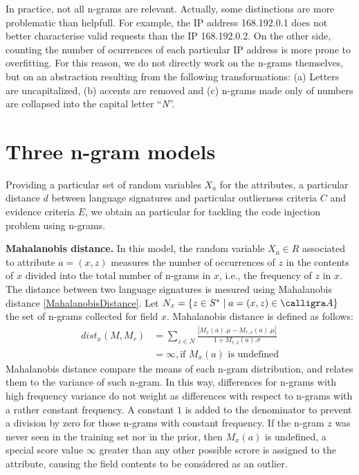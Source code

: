 \documentclass[runningheads,a4paper]{llncs}
\newcommand{\A}{\calligra A}
\begin{document}
In practice, not all n-grams are relevant. Actually, some distinctions are more problematic than helpfull. For example, the IP address 168.192.0.1 does not better characterise valid requests than the IP 168.192.0.2. On the other side, counting the number of ocurrences of each particular IP address is more prone to overfitting. For this reason, we do not directly work on the n-grams themselves, but on an abstraction resulting from the following transformations: (a) Letters are uncapitalized, (b) accents are removed and (c) n-grams made only of numbers are collapsed into the capital letter \enquote{\textit{N}}.

\section{Three n-gram models}

Providing a particular set of random variables $X_a$ for the attributes, a particular distance $d$ between language signatures and particular outlierness criteria $C$ and evidence criteria $E$, we obtain an particular for tackling the code injection problem using n-grams. 


\textbf{Mahalanobis distance.} In this model, the random variable $X_a \in R$ associated to attribute $a=(x,z)$ measures the number of occurrences of $z$ in the contents of $x$ divided into the total number of n-grams in $x$, i.e., the frequency of $z$ in $x$. The distance between two language signatures is mesured using Mahalanobis distance \ref{MahalanobisDistance}. Let $N_x = \{ z \in S^* \mid a=(x,z) \in \A  \}$ the set of n-grams collected for field $x$. Mahalanobis distance is defined as follows:
\begin{align*}
\label{MahalanobisDistance}
\textit{dist}_x(M,M_r) & = \sum_{z\in N} \frac{ | M_x(a).\mu - M_{r,x}(a).\mu |}{1+M_{r,x}(a).\sigma}\\
           & = \infty, \text{if } M_x(a) \text{ is undefined} 
\end{align*}
Mahalanobis distance compare the means of each n-gram distribution, and relates them to the variance of such n-gram. In this way, differences for n-grams with high frequency variance do not weight as differences with respect to n-grams with a rather constant frequency. A constant $1$ is added to the denominator to prevent a division by zero for those n-grams with constant frequency. If the n-gram $z$ was never seen in the training set nor in the prior, then $M_x(a)$ is undefined, a special score value $\infty$ greater than any other possible scrore is assigned to the attribute, causing the field contents to be considered as an outlier.   
\end{document}
